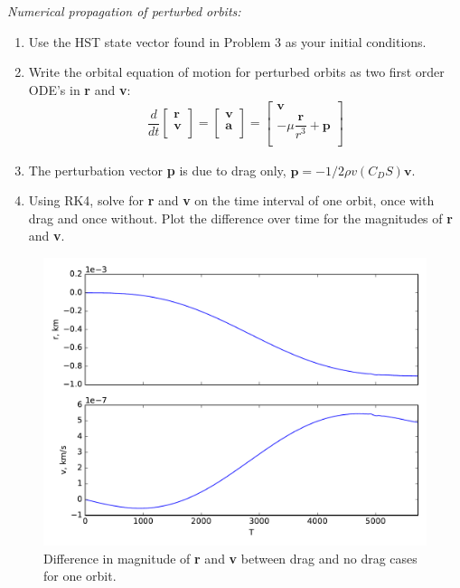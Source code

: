 \documentclass[onecolumn,10pt]{jhwhw}
\begin{document}
\clearpage
\problem{}
\textit{Numerical propagation of perturbed orbits:}
\begin{enumerate}
\item Use the HST state vector found in Problem 3 as your initial conditions.
\item Write the orbital equation of motion for perturbed orbits as two first order ODE’s in \textbf{r} and \textbf{v}:
\begin{align*}
\dfrac{d}{dt} \begin{bmatrix}
          \textbf{r} \\
          \textbf{v} \\
        \end{bmatrix}
  = \begin{bmatrix}
          \textbf{v} \\
          \textbf{a} \\
        \end{bmatrix}
  = \begin{bmatrix}
          \textbf{v} \\
          -\mu \dfrac{\textbf{r}}{r^3} + \textbf{p} \\
        \end{bmatrix}
\end{align*}
\item The perturbation vector \textbf{p} is due to drag only, $\textbf{p} = -1/2 \rho v(C_D S)\textbf{v}$.
\item Using RK4, solve for \textbf{r} and \textbf{v} on the time interval of one orbit, once with drag and once without. Plot the
difference over time for the magnitudes of \textbf{r} and \textbf{v}.
\end{enumerate}

\begin{figure}[tbh!]
\begin{center}
\includegraphics[height=0.55\textheight]{p7.pdf}
\end{center}
\caption{Difference in magnitude of \textbf{r} and \textbf{v} between drag and no drag cases for one orbit.}
\end{figure}
\end{document}
